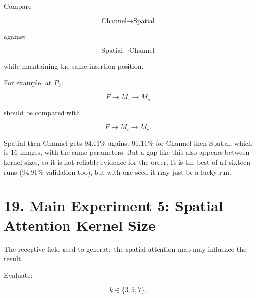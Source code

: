 \documentclass[10pt]{article}
\begin{document}
Compare:

\[
\boxed{
\text{Channel}
\rightarrow
\text{Spatial}
}
\]

against

\[
\boxed{
\text{Spatial}
\rightarrow
\text{Channel}
}
\]

while maintaining the same insertion position.

For example, at $P_3$:

\[
F
\rightarrow
M_c
\rightarrow
M_s
\]

should be compared with

\[
F
\rightarrow
M_s
\rightarrow
M_c.
\]

\begin{table}[H]
\centering
\caption{Attention order at $P_3$.}
\label{tab:order}
\end{table}

Spatial then Channel gets 94.01\% against 91.11\% for Channel then Spatial, which is 16 images, with the same parameters. But a gap like this also appears between kernel sizes, so it is not reliable evidence for the order. It is the best of all sixteen runs (94.91\% validation too), but with one seed it may just be a lucky run.

\section*{19. Main Experiment 5: Spatial Attention Kernel Size}

The receptive field used to generate the spatial attention map may influence
the result.

Evaluate:

\[
k\in\{3,5,7\}.
\]
\end{document}
